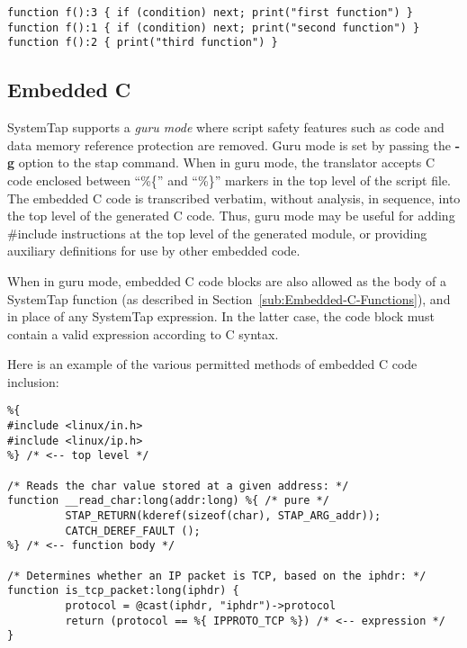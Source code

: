 \documentclass[twoside,english]{article}
\newenvironment{vindent}
{\begin{list}{}{\setlength{\listparindent}{6pt}}
\item[]}
{\end{list}}
\begin{document}
\begin{vindent}
\begin{verbatim}
function f():3 { if (condition) next; print("first function") }
function f():1 { if (condition) next; print("second function") }
function f():2 { print("third function") }
\end{verbatim}
\end{vindent}

\subsection{Embedded C\label{sub:Embedded-C}}
SystemTap supports a \emph{guru mode} where script
safety features such as code and data memory reference protection are
removed. Guru mode is set by passing the \textbf{-g} option to the
stap command. When in guru mode, the translator accepts C code
enclosed between {}``\%\{'' and {}``\%\}'' markers in the top level of
the script file. The embedded C code is transcribed verbatim, without
analysis, in sequence, into the top level of the generated C
code. Thus, guru mode may be useful for adding \#include instructions
at the top level of the generated module, or providing auxiliary
definitions for use by other embedded code.

When in guru mode, embedded C code blocks are also allowed as the body
of a SystemTap function (as described in
Section~\ref{sub:Embedded-C-Functions}), and in place of any SystemTap
expression. In the latter case, the code block must contain a valid
expression according to C syntax.

Here is an example of the various permitted methods of embedded C code inclusion:

\begin{vindent}
\begin{verbatim}
%{
#include <linux/in.h>
#include <linux/ip.h>
%} /* <-- top level */

/* Reads the char value stored at a given address: */ 
function __read_char:long(addr:long) %{ /* pure */
         STAP_RETURN(kderef(sizeof(char), STAP_ARG_addr));
         CATCH_DEREF_FAULT ();
%} /* <-- function body */

/* Determines whether an IP packet is TCP, based on the iphdr: */
function is_tcp_packet:long(iphdr) {
         protocol = @cast(iphdr, "iphdr")->protocol
         return (protocol == %{ IPPROTO_TCP %}) /* <-- expression */
}
\end{verbatim}
\end{vindent}
\end{document}
